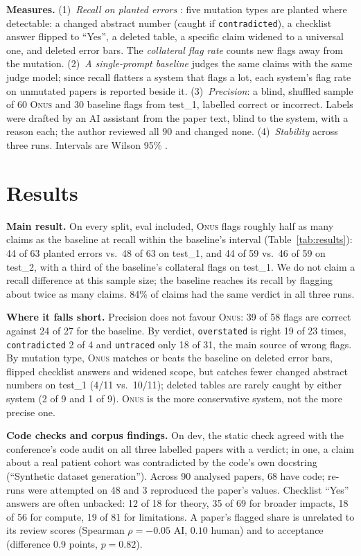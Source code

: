 \documentclass[10pt,twocolumn,twoside,letterpaper]{article}
\newcommand{\onus}{\textsc{Onus}}
\newcommand{\verdict}[1]{\texttt{#1}}
\begin{document}
\textbf{Measures.} (1)~\emph{Recall on planted errors} \citep{demillo1978hints}: five mutation types are
planted where detectable: a changed abstract number (caught if \verdict{contradicted}), a checklist answer
flipped to ``Yes'', a deleted table, a specific claim widened to a universal one, and deleted error bars.
The \emph{collateral flag rate} counts new flags away from the mutation. (2)~\emph{A single-prompt baseline}
judges the same claims with the same judge model; since recall flatters a system that flags a lot, each
system's flag rate on unmutated papers is reported beside it. (3)~\emph{Precision}: a blind, shuffled sample
of 60 \onus{} and 30 baseline flags from test\_1, labelled correct or incorrect. Labels were drafted by an AI
assistant from the paper text, blind to the system, with a reason each; the author reviewed all 90 and
changed none. (4)~\emph{Stability} across three runs. Intervals are Wilson 95\% \citep{wilson1927probable}.

\section{Results}


\textbf{Main result.} On every split, eval included, \onus{} flags roughly half as many claims as the baseline
at recall within the baseline's interval (Table~\ref{tab:results}): 44 of 63 planted errors vs.\ 48 of 63 on
test\_1, and 44 of 59 vs.\ 46 of 59 on test\_2, with a third of the baseline's collateral flags on test\_1. We
do not claim a recall difference at this sample size; the baseline reaches its recall by flagging about twice
as many claims. 84\% of claims had the same verdict in all three runs.

\textbf{Where it falls short.} Precision does not favour \onus{}: 39 of 58 flags are correct against 24 of 27
for the baseline. By verdict, \verdict{overstated} is right 19 of 23 times, \verdict{contradicted} 2 of 4 and
\verdict{untraced} only 18 of 31, the main source of wrong flags. By mutation type, \onus{} matches or beats
the baseline on deleted error bars, flipped checklist answers and widened scope, but catches fewer changed
abstract numbers on test\_1 (4/11 vs.\ 10/11); deleted tables are rarely caught by either system (2 of 9 and 1
of 9). \onus{} is the more conservative system, not the more precise one.

\textbf{Code checks and corpus findings.} On dev, the static check agreed with the conference's code audit on
all three labelled papers with a verdict; in one, a claim about a real patient cohort was contradicted by the
code's own docstring (``Synthetic dataset generation''). Across 90 analysed papers, 68 have code; re-runs were
attempted on 48 and 3 reproduced the paper's values. Checklist ``Yes'' answers are often unbacked: 12 of 18 for
theory, 35 of 69 for broader impacts, 18 of 56 for compute, 19 of 81 for limitations. A paper's flagged share is
unrelated to its review scores (Spearman $\rho=-0.05$ AI, $0.10$ human) and to acceptance (difference 0.9
points, $p=0.82$).
\end{document}
